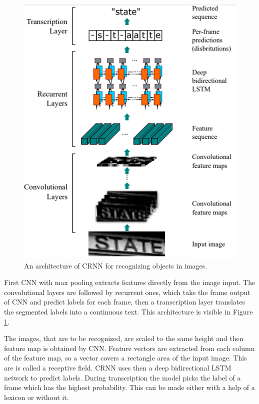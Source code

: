 \begin{figure}[hbtp]
    \centering
    \includegraphics[scale=0.46]{obrazky/crnn.png}

    \caption{An architecture of CRNN for recognizing objects in images.\cite{crnn}}
    \label{img:CRNN}
\end{figure}

First CNN with max pooling extracts features directly from the image input. The convolutional layers are followed by recurrent ones, which take the frame output of CNN and predict labels for each frame, then a transcription layer translates the segmented labels into a continuous text. This architecture is visible in Figure \ref*{img:CRNN}.

The images, that are to be recognized, are scaled to the same height and then feature map is obtained by CNN. Feature
vectors are extracted from each column of the feature map, so a vector covers a rectangle area of the input image. This are is called a receptive field. CRNN uses then a deep bidirectional LSTM network to predict labels. During transcription the model picks the label of a frame which has the highest probability. This can be made either with a help of a lexicon or without it.\cite{crnn}









